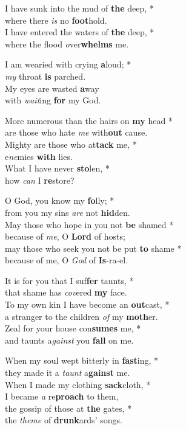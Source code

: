 I have sunk into the mud of \textbf{the} deep, *\\
where there \emph{is} no \textbf{foot}hold. \\
I have entered the waters of \textbf{the} deep, *\\
where the flood \emph{o}ver\textbf{whelms} me.

I am wearied with crying \textbf{a}loud; *\\
\emph{my} throat \textbf{is} parched. \\
My eyes are wasted \textbf{a}way \\
with \emph{wait}ing \textbf{for} my God. 

More numerous than the hairs on \textbf{my} head *\\
are those who hate \emph{me} with\textbf{out} cause. \\
Mighty are those who at\textbf{tack} me, *\\
e\emph{ne}mies \textbf{with} lies. \\
What I have never \textbf{sto}len, *\\
how \emph{can} I \textbf{re}store? 

O God, you know my \textbf{fo}lly; *\\
from you my sins \emph{are} not \textbf{hid}den. \\
May those who hope in you not \textbf{be} shamed *\\
because of \emph{me}, O \textbf{Lord} of hosts; \\
may those who seek you not be put \textbf{to} shame *\\
because of me, O \emph{God} of \textbf{Is}-ra-el.

It is for you that I suf\textbf{fer} taunts, *\\
that shame has \emph{cov}ered \textbf{my} face. \\
To my own kin I have become an \textbf{out}cast, *\\
a stranger to the children \emph{of} my \textbf{moth}er. \\
Zeal for your house con\textbf{sumes} me, *\\
and taunts a\emph{gainst} you \textbf{fall} on me.

When my soul wept bitterly in \textbf{fast}ing, *\\
they made it a \emph{taunt} a\textbf{gainst} me. \\
When I made my clothing \textbf{sack}cloth, *\\
I became \emph{a} re\textbf{proach} to them, \\
the gossip of those at \textbf{the} gates, *\\
the \emph{theme} of \textbf{drunk}ards' songs. 

